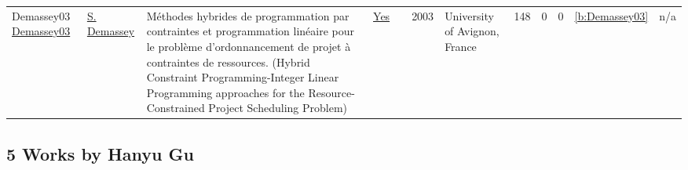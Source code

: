 {\begin{longtable}{>{\raggedright\arraybackslash}p{3cm}>{\raggedright\arraybackslash}p{6cm}>{\raggedright\arraybackslash}p{6.5cm}rrrp{2.5cm}rrrrr}
Demassey03 \href{https://tel.archives-ouvertes.fr/tel-00293564}{Demassey03} & \hyperref[auth:a245]{S. Demassey} & M{\'{e}}thodes hybrides de programmation par contraintes et programmation lin{\'{e}}aire pour le probl{\`{e}}me d'ordonnancement de projet {\`{a}} contraintes de ressources. (Hybrid Constraint Programming-Integer Linear Programming approaches for the Resource-Constrained Project Scheduling Problem) & \href{../works/Demassey03.pdf}{Yes} & \cite{Demassey03} & 2003 & University of Avignon, France & 148 & 0 & 0 & \ref{b:Demassey03} & n/a\\
\end{longtable}
}

\clearpage
\subsection{5 Works by Hanyu Gu}
\label{sec:a339}
